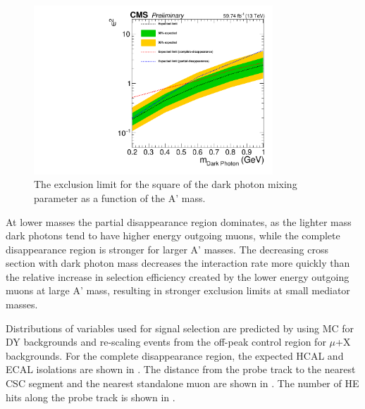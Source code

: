 \begin{figure}[htbp]
	\centering
	\includegraphics[width=0.8\textwidth]{figures/Limit_AllRegions.pdf}
	\caption[Exclusion Limits on the Dark Photon Mixing Parameter]{The exclusion limit for the square of the dark photon mixing parameter as a function of the A' mass.}
	\label{fig:limits}
\end{figure}

At lower masses the partial disappearance region dominates, as the lighter mass dark photons tend to have higher energy outgoing muons, while the complete disappearance region is stronger for larger A' masses. 
The decreasing cross section with dark photon mass decreases the interaction rate more quickly than the relative increase in selection efficiency created by the lower energy outgoing muons at large A' mass, resulting in stronger exclusion limits at small mediator masses. 

Distributions of variables used for signal selection are predicted by using MC for DY backgrounds and re-scaling events from the off-peak control region for $\mu$+X backgrounds.
For the complete disappearance region, the expected HCAL and ECAL isolations are shown in . 
The distance from the probe track to the nearest CSC segment and the nearest standalone muon are shown in .
The number of HE hits along the probe track is shown in .

